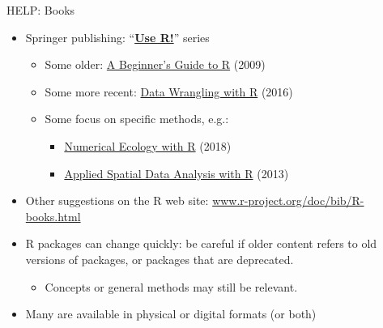 \documentclass[
  11pt,
  ignorenonframetext,
]{beamer}
\providecommand{\tightlist}{%
  \setlength{\itemsep}{0pt}\setlength{\parskip}{0pt}}
\begin{document}
\begin{frame}{HELP: Books}
\protect\hypertarget{help-books}{}
\begin{itemize}
\item
  Springer publishing:
  ``\textbf{\href{https://www.springer.com/series/6991}{Use R!}}''
  series

  \begin{itemize}
  \tightlist
  \item
    Some older:
    \href{https://link.springer.com/book/10.1007/978-0-387-93837-0}{A
    Beginner's Guide to R} (2009)
  \item
    Some more recent:
    \href{https://link.springer.com/book/10.1007/978-3-319-45599-0}{Data
    Wrangling with R} (2016)
  \item
    Some focus on specific methods, e.g.:

    \begin{itemize}
    \tightlist
    \item
      \href{https://link.springer.com/book/10.1007/978-3-319-71404-2}{Numerical
      Ecology with R} (2018)
    \item
      \href{https://link.springer.com/book/10.1007/978-1-4614-7618-4}{Applied
      Spatial Data Analysis with R} (2013)
    \end{itemize}
  \end{itemize}
\item
  Other suggestions on the R web site:
  \href{https://www.r-project.org/doc/bib/R-books.html}{www.r-project.org/doc/bib/R-books.html}
\item
  R packages can change quickly: be careful if older content refers to
  old versions of packages, or packages that are deprecated.

  \begin{itemize}
  \tightlist
  \item
    Concepts or general methods may still be relevant.
  \end{itemize}
\item
  Many are available in physical or digital formats (or both)
\end{itemize}
\end{frame}
\end{document}
